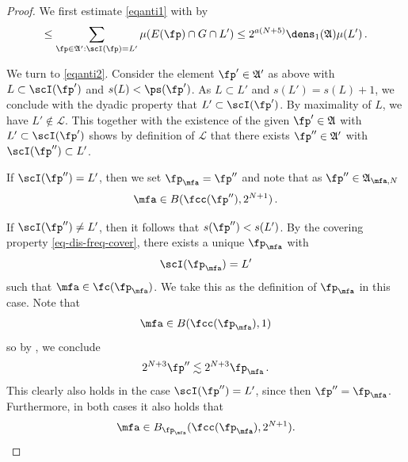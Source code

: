 \begin{proof}
We first estimate \eqref{eqanti1}
with  by
\begin{equation}\label{equanti1.5}
    \le \sum_{\fp\in\mathfrak{A}':\scI(\fp)=L'}\mu(E(\fp)\cap G\cap L')\le 2^{a(N+5)}\dens_1(\mathfrak{A})\mu(L')\, .
\end{equation}

We turn to \eqref{eqanti2}.
Consider the element $\fp'\in \mathfrak{A}'$ as above
with $L\subset \scI(\fp')$ and $s(L)<\ps(\fp')$.
As $L\subset L'$ and $s(L')=s(L)+1$, we conclude with the dyadic property that $L'\subset \scI(\fp')$.
By maximality of $L$, we have
$L'\not\in \mathcal{L}$.
This together with the existence of the given $\fp'\in \mathfrak{A}$
with $L'\subset \scI(\fp')$
shows by definition of $\mathcal{L}$ that there exists $\fp''\in \mathfrak{A}'$ with
$\scI(\fp'')\subset L'$.

If $\scI(\fp'') = L'$, then we set $\fp_{\mfa} = \fp''$ and note that as $\fp'' \in \mathfrak{A}_{\mfa,N}$
\begin{equation}
    \mfa \in B(\fcc(\fp''), 2^{N+1})\, .
\end{equation}

If $\scI(\fp'') \ne L'$, then it follows that $s(\fp'') < s(L')$.
By the covering property \eqref{eq-dis-freq-cover}, there exists a unique $\fp_{\mfa}$ with
\begin{equation*}
    \scI(\fp_{\mfa})=L'
\end{equation*}
such that $\mfa\in \fc(\fp_{\mfa})$. We take this as the definition of $\fp_\mfa$ in this case.
Note that
\begin{equation}
    \mfa\in B(\fcc(\fp_{\mfa}), 1)
\end{equation}
so by , we conclude
\begin{equation}
    2^{N+3}\fp'' \lesssim 2^{N+3}\fp_{\mfa} \, .
\end{equation}
This clearly also holds in the case $\scI(\fp'') = L'$, since then $\fp'' = \fp_\mfa$. Furthermore,
in both cases it also holds that
\begin{equation}
    \mfa\in B_{\fp_{\mfa}}(\fcc(\fp_{\mfa}), 2^{N+1}).
\end{equation}


\end{proof}
